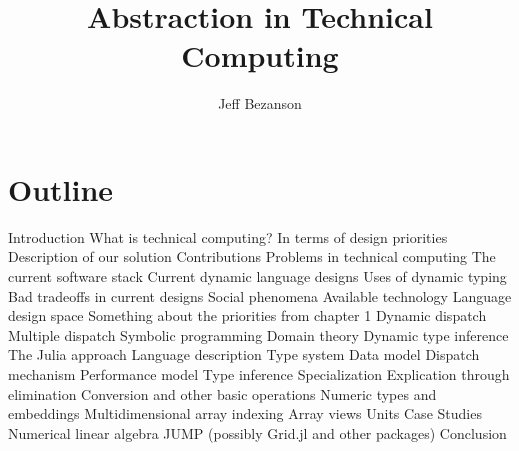 \documentclass[12pt]{article}
\title{Abstraction in Technical Computing}
\author{Jeff Bezanson}
\begin{document}
\maketitle

\section{Outline}

\begin{outline}[enumerate]
  \1 Introduction
    \2 What is technical computing?
      \3 In terms of design priorities
    \2 Description of our solution
    \2 Contributions
  \1 Problems in technical computing
    \2 The current software stack
    \2 Current dynamic language designs
    \2 Uses of dynamic typing
    \2 Bad tradeoffs in current designs
    \2 Social phenomena
  \1 Available technology
    \2 Language design space
      \3 Something about the priorities from chapter 1
    \2 Dynamic dispatch
    \2 Multiple dispatch
      \3 Symbolic programming
    \2 Domain theory
    \2 Dynamic type inference
  \1 The Julia approach
    \2 Language description
      \3 Type system
      \3 Data model
      \3 Dispatch mechanism
    \2 Performance model
      \3 Type inference
      \3 Specialization
    \2 Explication through elimination
      \3 Conversion and other basic operations
      \3 Numeric types and embeddings
      \3 Multidimensional array indexing
      \3 Array views
      \3 Units
  \1 Case Studies
    \2 Numerical linear algebra
    \2 JUMP
    \2 (possibly Grid.jl and other packages)
  \1 Conclusion
\end{outline}
\end{document}
